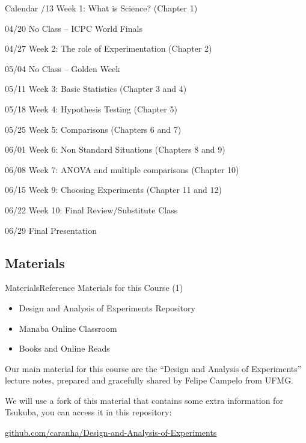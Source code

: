 \documentclass[t]{beamer}
\begin{document}
\begin{ftst}
{Calendar}{}
/13 Week 1: What is Science? (Chapter 1)
\item 04/20 \alert{No Class -- ICPC World Finals}
\item 04/27 Week 2: The role of Experimentation (Chapter 2)
\item 05/04 \alert{No Class -- Golden Week}
\item 05/11 Week 3: Basic Statistics (Chapter 3 and 4)
\item 05/18 Week 4: Hypothesis Testing (Chapter 5)
\item 05/25 Week 5: Comparisons (Chapters 6 and 7)
\item 06/01 Week 6: Non Standard Situations (Chapters 8 and 9)
\item 06/08 Week 7: ANOVA and multiple comparisons (Chapter 10)
\item 06/15 Week 9: Choosing Experiments (Chapter 11 and 12)
\item 06/22 Week 10: Final Review/Substitute Class
\item 06/29 \alert{Final Presentation}
\eitem
\end{ftst}

\subsection{Materials}

\begin{ftst}
  {Materials}{Reference Materials for this Course (1)}
  \begin{itemize}
  \item \alert{Design and Analysis of Experiments Repository}
  \item Manaba Online Classroom
  \item Books and Online Reads
  \end{itemize}

  \begin{block}{}
    Our main material for this course are the ``Design and Analysis of
    Experiments'' lecture notes, prepared and gracefully shared by
    Felipe Campelo from UFMG.

    \vone

    We will use a fork of this material that contains some extra information
    for Tsukuba, you can access it in this repository:

    \vone
    
    {\color{blue}\underline{{\small \href{https://github.com/caranha/Design-and-Analysis-of-Experiments}{github.com/caranha/Design-and-Analysis-of-Experiments}}}}
  \end{block}
  
\end{ftst}
\end{document}

